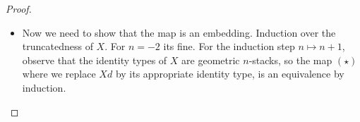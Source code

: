 \begin{proof}
\begin{itemize}
\[\begin{tikzcd}
	{\prod_{d :D'}W d} & {\prod_{d : D} W(jd)} \\
	{\prod_{d :D'} X d} & {\prod_{d : D} X(jd)}
	\arrow["\sim", from=1-1, to=1-2]
	\arrow[from=1-1, to=2-1]
	\arrow["{\bT -surj}", from=1-2, to=2-2]
	\arrow[from=2-1, to=2-2]
\end{tikzcd}\]
\item
Now we need to show that the map is an embedding. Induction over the truncatedness of $X$. For $n=-2$ its fine.
For the induction step $n \mapsto n+1$, observe that the identity types of $X$ are geometric $n$-stacks, so the map $(\star)$ where we replace $X d$ by its appropriate identity type, is an equivalence by induction.
\end{itemize}
\end{proof}


